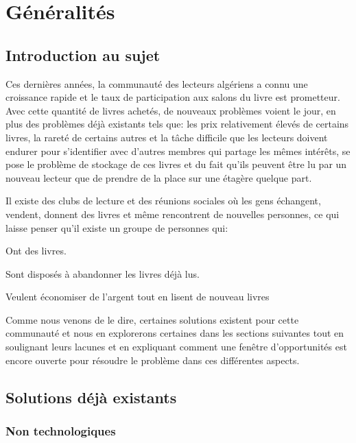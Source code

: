 

\chapter{Généralités}
\section{Introduction au sujet}

Ces dernières années, la communauté des lecteurs algériens a connu une croissance rapide et le taux de participation aux salons du livre est prometteur. Avec cette quantité de livres achetés, de nouveaux problèmes voient le jour, en plus des problèmes déjà existants tels que: les prix relativement élevés de certains livres, la rareté de certains autres et la tâche difficile que les lecteurs doivent endurer pour s'identifier avec d'autres membres qui partage les mêmes intérêts, se pose le problème de stockage de ces livres et du fait qu’ils peuvent être lu par un nouveau lecteur que de prendre de la place sur une étagère quelque part.

Il existe des clubs de lecture et des réunions sociales où les gens échangent, vendent, donnent des livres et même rencontrent de nouvelles personnes, ce qui laisse penser qu'il existe un groupe de personnes qui:

\begin{list}{•}{}
	\item Ont des livres.
	\item Sont disposés à abandonner les livres déjà lus.
	\item Veulent économiser de l’argent tout en lisent de nouveau livres
\end{list}

Comme nous venons de le dire, certaines solutions existent pour cette communauté et nous en explorerons certaines dans les sections suivantes tout en soulignant leurs lacunes et en expliquant comment une fenêtre d'opportunités est encore ouverte pour résoudre le problème dans ces différentes aspects.

\section{Solutions déjà existants}

\subsection{Non technologiques}


